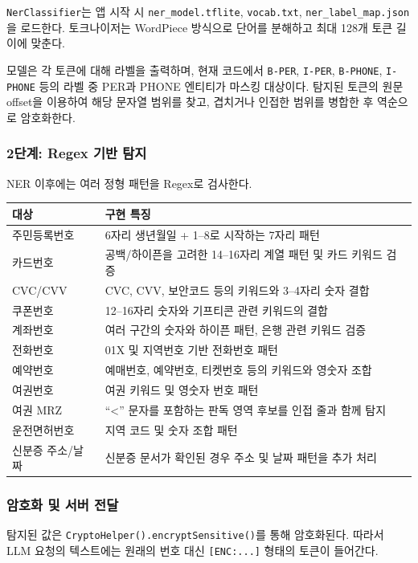\documentclass[11pt,a4paper]{article}
\begin{document}
\texttt{NerClassifier}는 앱 시작 시 \texttt{ner\_model.tflite}, \texttt{vocab.txt}, \texttt{ner\_label\_map.json}을 로드한다. 토크나이저는 WordPiece 방식으로 단어를 분해하고 최대 128개 토큰 길이에 맞춘다.

모델은 각 토큰에 대해 라벨을 출력하며, 현재 코드에서 \texttt{B-PER}, \texttt{I-PER}, \texttt{B-PHONE}, \texttt{I-PHONE} 등의 라벨 중 PER과 PHONE 엔티티가 마스킹 대상이다. 탐지된 토큰의 원문 offset을 이용하여 해당 문자열 범위를 찾고, 겹치거나 인접한 범위를 병합한 후 역순으로 암호화한다.

\subsubsection{2단계: Regex 기반 탐지}

NER 이후에는 여러 정형 패턴을 Regex로 검사한다.

\begin{longtable}{p{3.4cm}p{7.8cm}}
\toprule
\textbf{대상} & \textbf{구현 특징}\\
\midrule
주민등록번호 & 6자리 생년월일 + 1--8로 시작하는 7자리 패턴\\
카드번호 & 공백/하이픈을 고려한 14--16자리 계열 패턴 및 카드 키워드 검증\\
CVC/CVV & CVC, CVV, 보안코드 등의 키워드와 3--4자리 숫자 결합\\
쿠폰번호 & 12--16자리 숫자와 기프티콘 관련 키워드의 결합\\
계좌번호 & 여러 구간의 숫자와 하이픈 패턴, 은행 관련 키워드 검증\\
전화번호 & 01X 및 지역번호 기반 전화번호 패턴\\
예약번호 & 예매번호, 예약번호, 티켓번호 등의 키워드와 영숫자 조합\\
여권번호 & 여권 키워드 및 영숫자 번호 패턴\\
여권 MRZ & ``<'' 문자를 포함하는 판독 영역 후보를 인접 줄과 함께 탐지\\
운전면허번호 & 지역 코드 및 숫자 조합 패턴\\
신분증 주소/날짜 & 신분증 문서가 확인된 경우 주소 및 날짜 패턴을 추가 처리\\
\bottomrule
\end{longtable}

\subsubsection{암호화 및 서버 전달}

탐지된 값은 \texttt{CryptoHelper().encryptSensitive()}를 통해 암호화된다. 따라서 LLM 요청의 텍스트에는 원래의 번호 대신 \texttt{[ENC:...]} 형태의 토큰이 들어간다.
\end{document}
